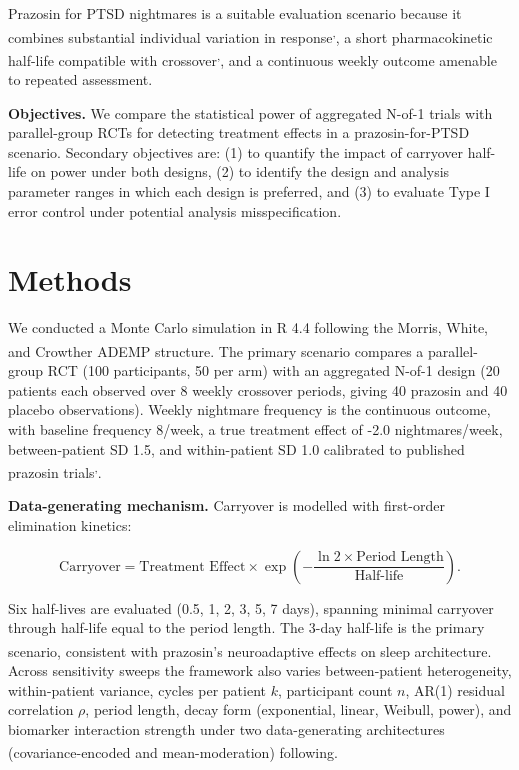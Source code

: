 \documentclass[
  11pt,
]{article}
\begin{document}
Prazosin for PTSD nightmares is a suitable evaluation scenario because
it combines substantial individual variation in
response\textsuperscript{,},
a short pharmacokinetic half-life compatible with
crossover\textsuperscript{,},
and a continuous weekly outcome amenable to repeated assessment.

\textbf{Objectives.} We compare the statistical power of aggregated
N-of-1 trials with parallel-group RCTs for detecting treatment effects
in a prazosin-for-PTSD scenario. Secondary objectives are: (1) to
quantify the impact of carryover half-life on power under both designs,
(2) to identify the design and analysis parameter ranges in which each
design is preferred, and (3) to evaluate Type I error control under
potential analysis misspecification.

\section{Methods}\label{methods}

We conducted a Monte Carlo simulation in R 4.4 following the Morris,
White, and Crowther\textsuperscript{}
ADEMP structure. The primary scenario compares a parallel-group RCT (100
participants, 50 per arm) with an aggregated N-of-1 design (20 patients
each observed over 8 weekly crossover periods, giving 40 prazosin and 40
placebo observations). Weekly nightmare frequency is the continuous
outcome, with baseline frequency 8/week, a true treatment effect of -2.0
nightmares/week, between-patient SD 1.5, and within-patient SD 1.0
calibrated to published prazosin
trials\textsuperscript{,}.

\textbf{Data-generating mechanism.} Carryover is modelled with
first-order elimination kinetics:

\[\text{Carryover} =
  \text{Treatment Effect}\times
  \exp\!\left(-\frac{\ln 2 \times
  \text{Period Length}}{\text{Half-life}}\right).\]

Six half-lives are evaluated (0.5, 1, 2, 3, 5, 7 days), spanning minimal
carryover through half-life equal to the period length. The 3-day
half-life is the primary scenario, consistent with prazosin's
neuroadaptive effects on sleep
architecture\textsuperscript{}.
Across sensitivity sweeps the framework also varies between-patient
heterogeneity, within-patient variance, cycles per patient \(k\),
participant count \(n\), AR(1) residual correlation \(\rho\), period
length, decay form (exponential, linear, Weibull, power), and biomarker
interaction strength under two data-generating architectures
(covariance-encoded and mean-moderation)
following\textsuperscript{}.
\end{document}
